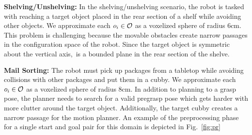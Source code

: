 \documentclass[a4paper]{report}
\begin{document}
\textbf{Shelving/Unshelving:}
 In the shelving/unshelving scenario, the robot is tasked with reaching a target object placed in the rear section of a shelf while avoiding other objects. %
 We approximate each $o_i \in \mathcal{O}$ as a voxelized sphere of radius 6cm.
 This problem is challenging because the movable obstacles create narrow passages in the configuration space of the robot.
 Since the target object is symmetric about the vertical axis,~\calG is a bounded plane in the rear section of the shelve.
 
\textbf{Mail Sorting:}
The robot must pick up packages from a tabletop while avoiding collisions with other packages and put them in a cubby. We approximate each $o_i \in \mathcal{O}$ as a voxelized sphere of radius 8cm. %
In addition to planning to a grasp pose, the planner needs to search for a valid pregrasp pose which gets harder with more clutter around the target object. Additionally, the target cubby creates a narrow passage for the motion planner.
%
An example of the preprocessing phase for a single start and goal pair for this domain is depicted in Fig.~\ref{fig:pr} 
\end{document}
